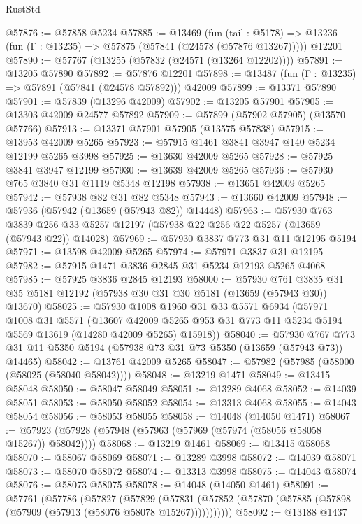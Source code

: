 \begin{lexlean}{RustStd}
\begin{coremodule}
@57876 := @57858 @5234
@57885 := @13469
    (fun (tail : @5178) => @13236 (fun (Γ : @13235) => @57875 (@57841 (@24578 (@57876 @13267)))))
    @12201
@57890 := @57767 (@13255 (@57832 (@24571 (@13264 @12202))))
@57891 := @13205 @57890
@57892 := @57876 @12201
@57898 := @13487 (fun (Γ : @13235) => @57891 (@57841 (@24578 @57892))) @42009
@57899 := @13371 @57890
@57901 := @57839 (@13296 @42009)
@57902 := @13205 @57901
@57905 := @13303 @42009 @24577 @57892
@57909 := @57899 (@57902 @57905) (@13570 @57766)
@57913 := @13371 @57901 @57905 (@13575 @57838)
@57915 := @13953 @42009 @5265
@57923 := @57915 @1461 @3841 @3947 @140 @5234 @12199 @5265 @3998
@57925 := @13630 @42009 @5265
@57928 := @57925 @3841 @3947 @12199
@57930 := @13639 @42009 @5265
@57936 := @57930 @765 @3840 @31 @1119 @5348 @12198
@57938 := @13651 @42009 @5265
@57942 := @57938 @82 @31 @82 @5348
@57943 := @13660 @42009
@57948 := @57936 (@57942 (@13659 (@57943 @82)) @14448)
@57963 := @57930
    @763
    @3839
    @256
    @33
    @5257
    @12197
    (@57938 @22 @256 @22 @5257 (@13659 (@57943 @22)) @14028)
@57969 := @57930 @3837 @773 @31 @11 @12195 @5194
@57971 := @13598 @42009 @5265
@57974 := @57971 @3837 @31 @12195
@57982 := @57915 @1471 @3836 @2845 @31 @5234 @12193 @5265 @4068
@57985 := @57925 @3836 @2845 @12193
@58000 := @57930
    @761
    @3835
    @31
    @35
    @5181
    @12192
    (@57938 @30 @31 @30 @5181 (@13659 (@57943 @30)) @13670)
@58025 := @57930
    @1008
    @1960
    @31
    @33
    @5571
    @6934
    (@57971
      @1008
      @31
      @5571
      (@13607 @42009 @5265 @953 @31 @773 @11 @5234 @5194 @5569 @13619 (@14280 @42009 @5265) @15918))
@58040 := @57930
    @767
    @773
    @31
    @11
    @5350
    @5194
    (@57938 @73 @31 @73 @5350 (@13659 (@57943 @73)) @14465)
@58042 := @13761 @42009 @5265
@58047 := @57982 (@57985 (@58000 (@58025 (@58040 @58042))))
@58048 := @13219 @1471
@58049 := @13415 @58048
@58050 := @58047 @58049
@58051 := @13289 @4068
@58052 := @14039 @58051
@58053 := @58050 @58052
@58054 := @13313 @4068
@58055 := @14043 @58054
@58056 := @58053 @58055
@58058 := @14048 (@14050 @1471)
@58067 := @57923 (@57928 (@57948 (@57963 (@57969 (@57974 (@58056 @58058 @15267)) @58042))))
@58068 := @13219 @1461
@58069 := @13415 @58068
@58070 := @58067 @58069
@58071 := @13289 @3998
@58072 := @14039 @58071
@58073 := @58070 @58072
@58074 := @13313 @3998
@58075 := @14043 @58074
@58076 := @58073 @58075
@58078 := @14048 (@14050 @1461)
@58091 := @57761
    (@57786
      (@57827
        (@57829
          (@57831 (@57852 (@57870 (@57885 (@57898 (@57909 (@57913 (@58076 @58078 @15267)))))))))))
@58092 := @13188 @1437

\end{coremodule}
\end{lexlean}

